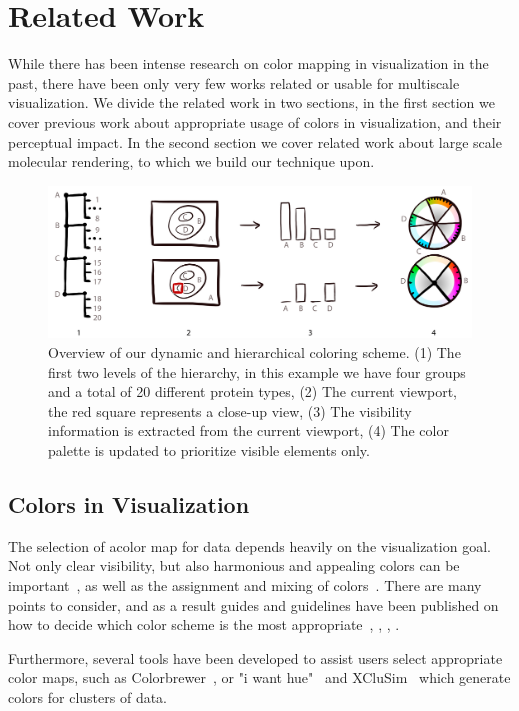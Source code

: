 \documentclass[review,journal]{vgtc}         %
\begin{document}
\section{Related Work}
While there has been intense research on color mapping in visualization in the past, there have been only very few works related or usable for multiscale visualization.
We divide the related work in two sections, in the first section we cover previous work about appropriate usage of colors in visualization, and their perceptual impact. 
In the second section we cover related work about large scale molecular rendering, to which we build our technique upon.

\begin{figure}[t]
	\centering
	\includegraphics[width=0.85\linewidth]{Figures/coloroverview}
	\caption{Overview of our dynamic and hierarchical coloring scheme. (1) The first two levels of the hierarchy, in this example we have four groups and a total of 20 different protein types, (2) The current viewport, the red square represents a close-up view, (3) The visibility information is extracted from the current viewport, (4) The color palette is updated to prioritize visible elements only.}
	\label{fig:coloroverview}
\end{figure}



\subsection{Colors in Visualization}
The selection of  acolor map for data depends heavily on the visualization goal. 
Not only clear visibility, but also harmonious and appealing colors can be important~\cite{ihaka2003colour}, as well as the assignment and mixing of colors~\cite{wang2008color}. 
There are many points to consider, and as a result guides and guidelines have been published on how to decide which color scheme is the most appropriate~\cite{bergman1995rule}, \cite{healey1996choosing}, \cite{bernard2015survey}, \cite{steiger2015explorative}.

Furthermore, several tools have been developed to assist users select appropriate color maps, such as Colorbrewer~\cite{harrower2003colorbrewer}, or "i want hue"~\cite{iwanthue} and XCluSim~\cite{l2015xclusim} which generate colors for clusters of data. 
\end{document}
